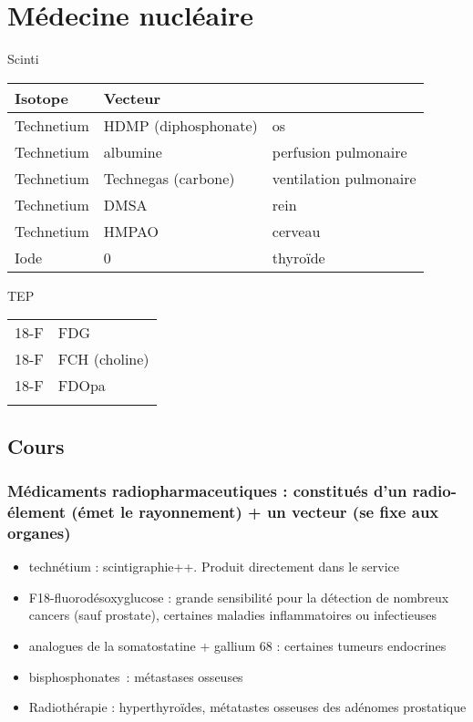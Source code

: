 \documentclass[11pt]{article}
\begin{document}
\section{Médecine nucléaire}
\label{sec:org16a8979}
Scinti
\begin{center}
\begin{tabular}{lll}
Isotope & Vecteur & \\
\hline
Technetium & HDMP (diphosphonate) & os\\
Technetium & albumine & perfusion pulmonaire\\
Technetium & Technegas (carbone) & ventilation pulmonaire\\
Technetium & DMSA & rein\\
Technetium & HMPAO & cerveau\\
\hline
Iode & 0 & thyroïde\\
\end{tabular}
\end{center}
TEP
\begin{center}
\begin{tabular}{ll}
18-F & FDG\\
18-F & FCH (choline)\\
18-F & FDOpa\\
 & \\
\end{tabular}
\end{center}
\subsection{Cours}
\label{sec:orgb31edbb}
\subsubsection{Médicaments radiopharmaceutiques : constitués d'un radio-élement (émet le rayonnement) + un vecteur (se fixe aux organes)}
\label{sec:org0ba2e12}
\begin{itemize}
\item technétium : scintigraphie++. Produit directement dans le service
\item F18-fluorodésoxyglucose : grande sensibilité pour la détection de nombreux
cancers (sauf prostate), certaines maladies inflammatoires ou infectieuses
\item analogues de la somatostatine + gallium 68 : certaines tumeurs endocrines
\item bisphosphonates : métastases osseuses
\item Radiothérapie : hyperthyroïdes, métatastes osseuses des adénomes prostatique
\end{itemize}
\end{document}
